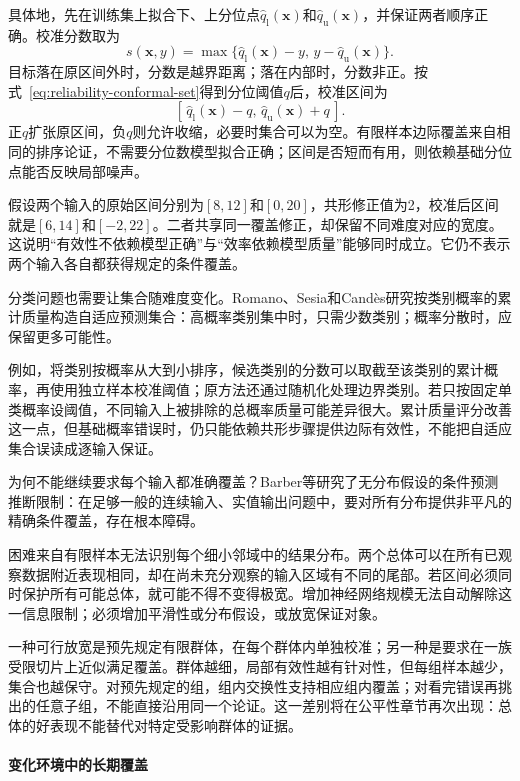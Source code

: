 具体地，先在训练集上拟合下、上分位点$\hat q_{\mathrm l}(\bm{x})$和$\hat q_{\mathrm u}(\bm{x})$，并保证两者顺序正确。校准分数取为
\begin{equation}
 s(\bm{x},y)
 =\max\{\hat q_{\mathrm l}(\bm{x})-y,\,
              y-\hat q_{\mathrm u}(\bm{x})\}.
 \label{eq:reliability-cqr-score}
\end{equation}
目标落在原区间外时，分数是越界距离；落在内部时，分数非正。按式~\eqref{eq:reliability-conformal-set}得到分位阈值$q$后，校准区间为
\[
 [\,\hat q_{\mathrm l}(\bm{x})-q,\,
       \hat q_{\mathrm u}(\bm{x})+q\,].
\]
正$q$扩张原区间，负$q$则允许收缩，必要时集合可以为空。有限样本边际覆盖来自相同的排序论证，不需要分位数模型拟合正确；区间是否短而有用，则依赖基础分位点能否反映局部噪声。

假设两个输入的原始区间分别为$[8,12]$和$[0,20]$，共形修正值为2，校准后区间就是$[6,14]$和$[-2,22]$。二者共享同一覆盖修正，却保留不同难度对应的宽度。这说明“有效性不依赖模型正确”与“效率依赖模型质量”能够同时成立。它仍不表示两个输入各自都获得规定的条件覆盖。

分类问题也需要让集合随难度变化。Romano、Sesia和Candès研究按类别概率的累计质量构造自适应预测集合：高概率类别集中时，只需少数类别；概率分散时，应保留更多可能性。

例如，将类别按概率从大到小排序，候选类别的分数可以取截至该类别的累计概率，再使用独立样本校准阈值；原方法还通过随机化处理边界类别。若只按固定单类概率设阈值，不同输入上被排除的总概率质量可能差异很大。累计质量评分改善这一点，但基础概率错误时，仍只能依赖共形步骤提供边际有效性，不能把自适应集合误读成逐输入保证。

为何不能继续要求每个输入都准确覆盖？Barber等研究了无分布假设的条件预测推断限制：在足够一般的连续输入、实值输出问题中，要对所有分布提供非平凡的精确条件覆盖，存在根本障碍。

困难来自有限样本无法识别每个细小邻域中的结果分布。两个总体可以在所有已观察数据附近表现相同，却在尚未充分观察的输入区域有不同的尾部。若区间必须同时保护所有可能总体，就可能不得不变得极宽。增加神经网络规模无法自动解除这一信息限制；必须增加平滑性或分布假设，或放宽保证对象。

一种可行放宽是预先规定有限群体，在每个群体内单独校准；另一种是要求在一族受限切片上近似满足覆盖。群体越细，局部有效性越有针对性，但每组样本越少，集合也越保守。对预先规定的组，组内交换性支持相应组内覆盖；对看完错误再挑出的任意子组，不能直接沿用同一个论证。这一差别将在公平性章节再次出现：总体的好表现不能替代对特定受影响群体的证据。

\paragraph{变化环境中的长期覆盖}

